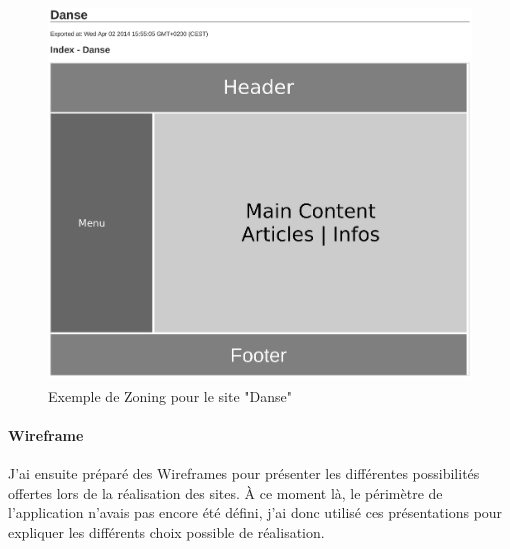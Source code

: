 \documentclass[11pt,a4paper,twoside]{report}
\begin{document}
				\begin{figure}[H]
					\centering
					\includegraphics[height=10cm]{Zone-Danse.eps}
					\caption{Exemple de Zoning pour le site "Danse"}
					\label{fig:Zoning Danse}
				\end{figure}

			\paragraph*{Wireframe}J'ai ensuite préparé des Wireframes pour présenter les différentes possibilités offertes lors de la réalisation des sites. À ce moment là, le périmètre de l'application n'avais pas encore été défini, j'ai donc utilisé ces présentations pour expliquer les différents choix possible de réalisation.
\end{document}
